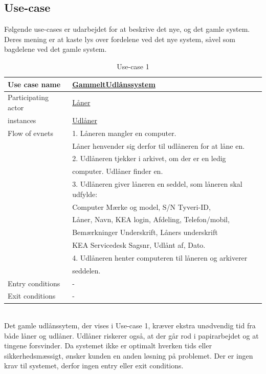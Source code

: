 \documentclass[a4paper]{article}
\begin{document}
\subsection{Use-case}
Følgende use-cases er udarbejdet for at beskrive det nye, og det gamle system. Deres mening er at kaste lys over fordelene ved det nye system, såvel som bagdelene ved det gamle system.
\begin{table}[h]
\caption{Use-case 1}
\begin{tabular}{ll}
Use case name                 & \underline{GammeltUdlånssystem} \\ \hline
Participating actor           & \underline{Låner} \\
instances                     & \underline{Udlåner} \\ \hline
Flow of evnets                & 1. Låneren mangler en computer.\\& Låner henvender sig derfor til udlåneren for at låne en.
\\& 2. Udlåneren tjekker i arkivet, om der er en ledig \\& computer. Udlåner finder en.
\\& 3. Udlåneren giver låneren en seddel, som låneren skal udfylde: \\& Computer Mærke og model, S/N Tyveri-ID, \\& Låner, Navn, KEA login, Afdeling, Telefon/mobil, \\& Bemærkninger Underskrift, Låners underskrift \\& KEA Servicedesk Sagsnr, Udlånt af, Dato.
\\& 4. Udlåneren henter computeren til låneren og arkiverer
\\& seddelen.\\ \hline
Entry conditions & - \\ \hline
Exit conditions  & -
\end{tabular}
\end{table} \\
Det gamle udlånssytem, der vises i Use-case 1, kræver ekstra unødvendig tid fra både låner og udlåner. Udlåner riskerer også, at der går rod i papirarbejdet og at tingene forsvinder. Da systemet ikke er optimalt hverken tids eller sikkerhedsmæssigt, ønsker kunden en anden løsning på problemet. Der er ingen krav til systemet, derfor ingen entry eller exit conditions.
\end{document}
